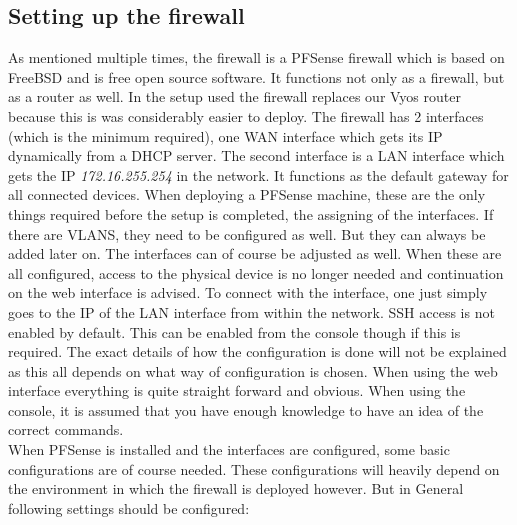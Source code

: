 \subsection{Setting up the firewall}
As mentioned multiple times, the firewall is a PFSense firewall which is based on FreeBSD and is free open source software. It functions not only as a firewall, but as a router as well. In the setup used the firewall replaces our Vyos router because this is was considerably easier to deploy. The firewall has 2 interfaces (which is the minimum required), one WAN interface which gets its IP dynamically from a DHCP server. The second interface is a LAN interface which gets the IP \textit{172.16.255.254} in the network. It functions as the default gateway for all connected devices. When deploying a PFSense machine, these are the only things required before the setup is completed, the assigning of the interfaces. If there are VLANS, they need to be configured as well. But they can always be added later on. The interfaces can of course be adjusted as well. When these are all configured, access to the physical device is no longer needed and continuation on the web interface is advised. To connect with the interface, one just simply goes to the IP of the LAN interface from within the network. SSH access is not enabled by default. This can be enabled from the console though if this is required. The exact details of how the configuration is done will not be explained as this all depends on what way of configuration is chosen. When using the web interface everything is quite straight forward and obvious. When using the console, it is assumed that you have enough knowledge to have an idea of the correct commands.\\
When PFSense is installed and the interfaces are configured, some basic configurations are of course needed. These configurations will heavily depend on the environment in which the firewall is deployed however. But in General following settings should be configured:

